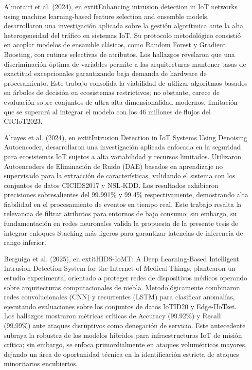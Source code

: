 Almotairi et al. (2024), en 	extit{Enhancing intrusion detection in IoT networks using machine learning-based feature selection and ensemble models}, desarrollaron una investigación aplicada sobre la gestión algorítmica ante la alta heterogeneidad del tráfico en sistemas IoT. Su protocolo metodológico consistió en acoplar modelos de ensamble clásicos, como Random Forest y Gradient Boosting, con rutinas selectivas de atributos. Los hallazgos revelaron que una discriminación óptima de variables permite a las arquitecturas mantener tasas de exactitud excepcionales garantizando baja demanda de hardware de procesamiento. Este trabajo consolida la viabilidad de utilizar algoritmos basados en árboles de decisión en ecosistemas restrictivos; no obstante, carece de evaluación sobre conjuntos de ultra-alta dimensionalidad modernos, limitación que se superará al integrar el modelo con los 46 millones de flujos del CICIoT2023.

Alrayes et al. (2024), en 	extit{Intrusion Detection in IoT Systems Using Denoising Autoencoder}, desarrollaron una investigación aplicada enfocada en la seguridad para ecosistemas IoT sujetos a alta variabilidad y recursos limitados. Utilizaron Autoencoders de Eliminación de Ruido (DAE) basados en aprendizaje no supervisado para la extracción de características, validando el sistema con los conjuntos de datos CICIDS2017 y NSL-KDD. Los resultados exhibieron precisiones sobresalientes del 99.991\% y 99.4\% respectivamente, demostrando alta fiabilidad en el procesamiento de eventos en tiempo real. Este trabajo resalta la relevancia de filtrar atributos para entornos de bajo consumo; sin embargo, su fundamentación en redes neuronales valida la propuesta de la presente tesis de integrar enfoques Stacking más ligeros para garantizar latencias de inferencia de rango inferior.

Berguiga et al. (2025), en 	extit{HIDS-IoMT: A Deep Learning-Based Intelligent Intrusion Detection System for the Internet of Medical Things}, plantearon un estudio experimental orientado a proteger redes de dispositivos médicos operando sobre arquitecturas computacionales de niebla. Metodológicamente combinaron redes convolucionales (CNN) y recurrentes (LSTM) para clasificar anomalías, ejecutando evaluaciones sobre los conjuntos de datos IoTID20 y Edge-IIoTset. Los hallazgos mostraron métricas críticas de Accuracy (99.92\%) y Recall (99.99\%) ante ataques disruptivos como denegación de servicio. Este antecedente subraya la robustez de los modelos híbridos para infraestructuras IoT de misión crítica; sin embargo, se enfoca primordialmente en ataques volumétricos mayores, dejando un área de oportunidad técnica en la identificación estricta de ataques minoritarios encubiertos.

